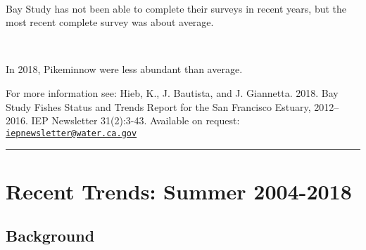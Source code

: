 \documentclass[
]{book}
\begin{document}
\begin{panel-grid}
\begin{columns-nocenter}
\begin{column40}
~

\end{column40}

\begin{column800}

Bay Study has not been able to complete their surveys in recent years, but the most recent complete survey was about average.

\end{column800}

\begin{column40}

~

\end{column40}

\begin{column800}

In 2018, Pikeminnow were less abundant than average.

\end{column800}

\end{columns-nocenter}

\end{panel-grid}

\begin{disclaimer}
For more information see: Hieb, K., J. Bautista, and J. Giannetta. 2018.
Bay Study Fishes Status and Trends Report for the San Francisco Estuary,
2012--2016. IEP Newsletter 31(2):3-43. Available on request:
\href{mailto:iepnewsletter@water.ca.gov}{\nolinkurl{iepnewsletter@water.ca.gov}}
\end{disclaimer}

\begin{center}\rule{0.5\linewidth}{0.5pt}\end{center}

\hypertarget{recent-trends-summer-2004-2018}{%
\section{Recent Trends: Summer 2004-2018}\label{recent-trends-summer-2004-2018}}

\hypertarget{background-5}{%
\subsection{Background}\label{background-5}}
\end{document}
